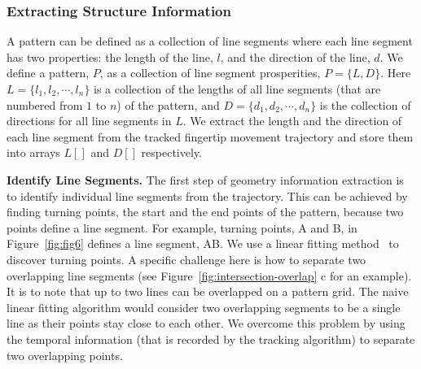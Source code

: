     \subsubsection{Extracting Structure Information}
        A pattern can be defined as a collection of line
        segments where each line segment has two properties:
        the length of the line, $l$, and the direction of the line, $d$.
        We define a
         pattern, $P$, as a collection of line segment prosperities,  $P=\{L, D\}$.
        Here $L=\{l_{1}, l_{2}, \cdots, l_{n}\}$ is a collection of the lengths
        of all line segments (that are numbered from $1$ to $n$) of the pattern, and $D=\{d_{1}, d_{2}, \cdots, d_{n}\}$ is the collection of directions for all line segments in $L$.
        We extract the length and the direction of each line segment from the tracked fingertip movement trajectory and store them
        into arrays $L[]$ and $D[]$ respectively.

        \noindent \textbf{Identify Line Segments.}
        The first step of geometry information extraction is to identify individual
        line segments from the trajectory. This can be achieved
        by finding turning points, the start and the end points of the pattern, because two points define a line segment. For example, turning points, A and B, in
        Figure~\ref{fig:fig6} defines a line segment, AB.
        We use a linear fitting
        method~\cite{Kutner2004Applied} to discover turning points. %
        A specific challenge here is how to separate two overlapping line segments (see
        Figure~\ref{fig:intersection-overlap} c for an example).
        It is to note that up to two lines can be overlapped on a pattern grid.
        The naive
        linear fitting algorithm would consider two overlapping segments to be a
        single line as their points stay close to each other. We overcome this problem
       by using the temporal information (that is recorded by the
        tracking algorithm) to separate two overlapping points.


